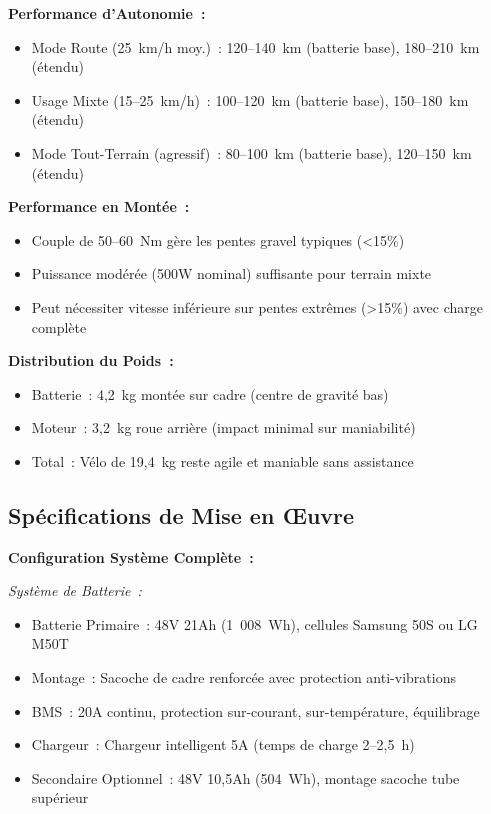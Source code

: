 \documentclass[12pt,a4paper]{article}
\begin{document}
\textbf{Performance d'Autonomie~:}
\begin{itemize}
    \item Mode Route (25~km/h moy.)~: 120--140~km (batterie base), 180--210~km (étendu)
    \item Usage Mixte (15--25~km/h)~: 100--120~km (batterie base), 150--180~km (étendu)
    \item Mode Tout-Terrain (agressif)~: 80--100~km (batterie base), 120--150~km (étendu)
\end{itemize}

\textbf{Performance en Montée~:}
\begin{itemize}
    \item Couple de 50--60~Nm gère les pentes gravel typiques (<15\%)
    \item Puissance modérée (500W nominal) suffisante pour terrain mixte
    \item Peut nécessiter vitesse inférieure sur pentes extrêmes (>15\%) avec charge complète
\end{itemize}

\textbf{Distribution du Poids~:}
\begin{itemize}
    \item Batterie~: 4,2~kg montée sur cadre (centre de gravité bas)
    \item Moteur~: 3,2~kg roue arrière (impact minimal sur maniabilité)
    \item Total~: Vélo de 19,4~kg reste agile et maniable sans assistance
\end{itemize}

\subsection{Spécifications de Mise en Œuvre}

\textbf{Configuration Système Complète~:}

\textit{Système de Batterie~:}
\begin{itemize}
    \item Batterie Primaire~: 48V 21Ah (1~008~Wh), cellules Samsung 50S ou LG M50T
    \item Montage~: Sacoche de cadre renforcée avec protection anti-vibrations
    \item BMS~: 20A continu, protection sur-courant, sur-température, équilibrage
    \item Chargeur~: Chargeur intelligent 5A (temps de charge 2--2,5~h)
    \item Secondaire Optionnel~: 48V 10,5Ah (504~Wh), montage sacoche tube supérieur
\end{itemize}
\end{document}
